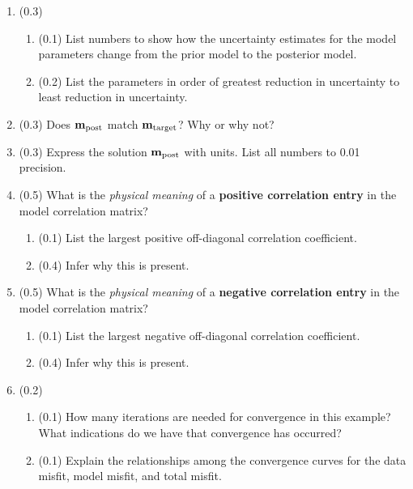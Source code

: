 \documentclass[11pt,titlepage,fleqn]{article}
\begin{document}
\begin{enumerate}

\item (0.3)
\begin{enumerate}
\item (0.1) List numbers to show how the uncertainty estimates for the model parameters change from the prior model to the posterior model.
\item (0.2) List the parameters in order of greatest reduction in uncertainty to least reduction in uncertainty.
\end{enumerate}


\item (0.3) Does $\mbox{${\bf m}$}_{\rm post}$ match $\mbox{${\bf m}$}_{\rm target}$? Why or why not?


\item (0.3) Express the solution $\mbox{${\bf m}$}_{\rm post}$ with units. List all numbers to 0.01 precision.


\item (0.5) What is the {\em physical meaning} of a {\bf positive correlation entry} in the model correlation matrix?
\begin{enumerate}
\item (0.1) List the largest positive off-diagonal correlation coefficient.
\item (0.4) Infer why this is present.
\end{enumerate}


\item (0.5) What is the {\em physical meaning} of a {\bf negative correlation entry} in the model correlation matrix?
\begin{enumerate}
\item (0.1) List the largest negative off-diagonal correlation coefficient.
\item (0.4) Infer why this is present.
\end{enumerate}


\item (0.2)
%
\begin{enumerate}
\item (0.1) How many iterations are needed for convergence in this example? \\
      What indications do we have that convergence has occurred?
\item (0.1) Explain the relationships among the convergence curves for the data misfit, model misfit, and total misfit.
\end{enumerate}


\end{enumerate}
\end{document}
